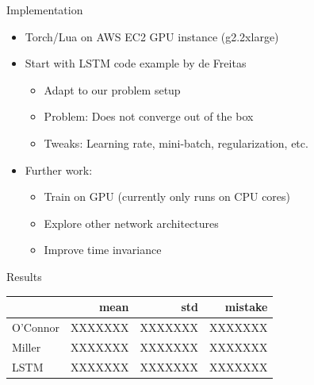 \documentclass{beamer}
\newcommand{\ra}[1]{\renewcommand{\arraystretch}{#1}}
\begin{document}
\begin{frame}{Implementation}
    \begin{itemize}
        \item Torch/Lua on AWS EC2 GPU instance (g2.2xlarge)
        \item Start with LSTM code example by de Freitas
        \begin{itemize}
            \item Adapt to our problem setup
            \item Problem: Does not converge out of the box
            \item Tweaks: Learning rate, mini-batch, regularization, etc.
        \end{itemize}
        \item Further work:
        \begin{itemize}
            \item Train on GPU (currently only runs on CPU cores)
            \item Explore other network architectures
            \item Improve time invariance
        \end{itemize}
    \end{itemize}
\end{frame}

\begin{frame}{Results}
    \begin{table}[H]
        \begin{center}
        \ra{1.2}
        \begin{tabular}{@{} lrrr @{}}
        \toprule
        {} & mean & std & mistake \\
        \midrule
        O'Connor  &     XXXXXXX &    XXXXXXX &    XXXXXXX \\
        Miller    &     XXXXXXX &    XXXXXXX &    XXXXXXX \\
        LSTM      &     XXXXXXX &    XXXXXXX &    XXXXXXX \\
        \bottomrule
        \end{tabular}
        \end{center}
    \end{table}
\end{frame}
\end{document}
